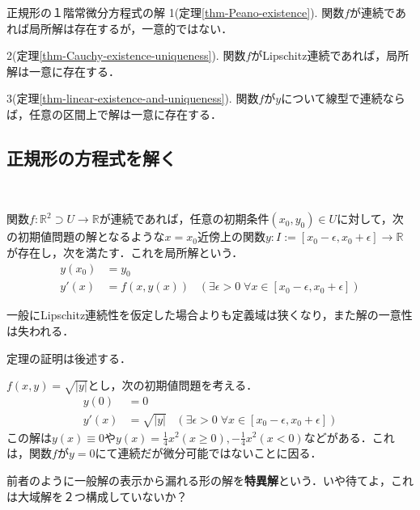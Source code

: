 \documentclass[uplatex,dvipdfmx]{jsreport}
\begin{document}
\begin{itembox}[l]{正規形の１階常微分方程式の解}
    1(定理\ref{thm-Peano-existence}). 関数$f$が連続であれば局所解は存在するが，一意的ではない．

    2(定理\ref{thm-Cauchy-existence-uniqueness}). 関数$f$がLipschitz連続であれば，局所解は一意に存在する．

    3(定理\ref{thm-linear-existence-and-uniqueness}). 関数$f$が$y$について線型で連続ならば，任意の区間上で解は一意に存在する．
\end{itembox}

\subsection{正規形の方程式を解く}

\begin{theorem}\label{thm-Peano-existence}　

    関数$f:\mathbb{R}^2\supset U\to\mathbb{R}$が連続であれば，任意の初期条件$(x_0,y_0)\in U$に対して，次の初期値問題の解となるような$x=x_0$近傍上の関数$y:I:=[x_0-\epsilon,x_0+\epsilon]\to\mathbb{R}$が存在し，次を満たす．これを局所解という．
    \begin{align*}
        y(x_0) &=y_0 \\
        y'(x) &=f(x,y(x))\;\;\;(\exists\epsilon>0\;\forall x\in [x_0-\epsilon,x_0+\epsilon])
    \end{align*}
\end{theorem}
\begin{remark}
    一般にLipschitz連続性を仮定した場合よりも定義域は狭くなり，また解の一意性は失われる．
\end{remark}
定理の証明は後述する．
\begin{example}[局所解は一意的ではない]
    $f(x,y)=\sqrt{|y|}$とし，次の初期値問題を考える．
    \begin{align*}
        y(0) &=0 \\
        y'(x) &=\sqrt{|y|}\;\;\;(\exists\epsilon>0\;\forall x\in [x_0-\epsilon,x_0+\epsilon])
    \end{align*}
    この解は$y(x)\equiv 0$や$y(x)=\frac{1}{4}x^2(x\ge 0), -\frac{1}{4}x^2(x<0)$などがある．これは，関数$f$が$y=0$にて連続だが微分可能ではないことに因る．

    前者のように一般解の表示から漏れる形の解を\textbf{特異解}という．いや待てよ，これは大域解を２つ構成していないか？
\end{example}
\end{document}
